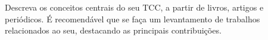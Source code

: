 Descreva os conceitos centrais do seu TCC, a partir de livros, artigos e periódicos. É recomendável que se faça um levantamento de trabalhos relacionados ao seu, destacando as principais contribuições.